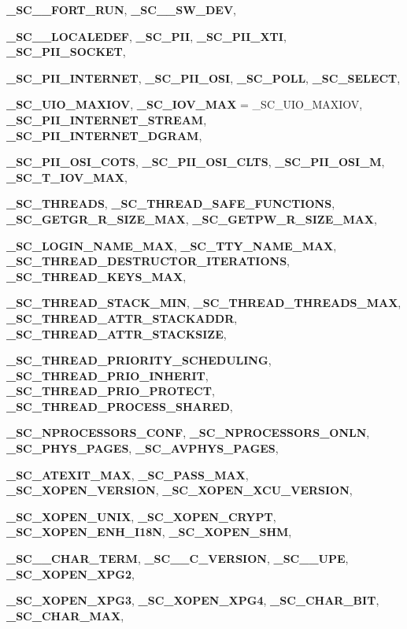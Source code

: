 \begin{DoxyCompactItemize}
{\bf \_\-SC\_\_\-FORT\_\-RUN}, 
{\bf \_\-SC\_\_\-SW\_\-DEV}, 
\par
{\bf \_\-SC\_\_\-LOCALEDEF}, 
{\bf \_\-SC\_\-PII}, 
{\bf \_\-SC\_\-PII\_\-XTI}, 
{\bf \_\-SC\_\-PII\_\-SOCKET}, 
\par
{\bf \_\-SC\_\-PII\_\-INTERNET}, 
{\bf \_\-SC\_\-PII\_\-OSI}, 
{\bf \_\-SC\_\-POLL}, 
{\bf \_\-SC\_\-SELECT}, 
\par
{\bf \_\-SC\_\-UIO\_\-MAXIOV}, 
{\bf \_\-SC\_\-IOV\_\-MAX} =  \_\-SC\_\-UIO\_\-MAXIOV, 
{\bf \_\-SC\_\-PII\_\-INTERNET\_\-STREAM}, 
{\bf \_\-SC\_\-PII\_\-INTERNET\_\-DGRAM}, 
\par
{\bf \_\-SC\_\-PII\_\-OSI\_\-COTS}, 
{\bf \_\-SC\_\-PII\_\-OSI\_\-CLTS}, 
{\bf \_\-SC\_\-PII\_\-OSI\_\-M}, 
{\bf \_\-SC\_\-T\_\-IOV\_\-MAX}, 
\par
{\bf \_\-SC\_\-THREADS}, 
{\bf \_\-SC\_\-THREAD\_\-SAFE\_\-FUNCTIONS}, 
{\bf \_\-SC\_\-GETGR\_\-R\_\-SIZE\_\-MAX}, 
{\bf \_\-SC\_\-GETPW\_\-R\_\-SIZE\_\-MAX}, 
\par
{\bf \_\-SC\_\-LOGIN\_\-NAME\_\-MAX}, 
{\bf \_\-SC\_\-TTY\_\-NAME\_\-MAX}, 
{\bf \_\-SC\_\-THREAD\_\-DESTRUCTOR\_\-ITERATIONS}, 
{\bf \_\-SC\_\-THREAD\_\-KEYS\_\-MAX}, 
\par
{\bf \_\-SC\_\-THREAD\_\-STACK\_\-MIN}, 
{\bf \_\-SC\_\-THREAD\_\-THREADS\_\-MAX}, 
{\bf \_\-SC\_\-THREAD\_\-ATTR\_\-STACKADDR}, 
{\bf \_\-SC\_\-THREAD\_\-ATTR\_\-STACKSIZE}, 
\par
{\bf \_\-SC\_\-THREAD\_\-PRIORITY\_\-SCHEDULING}, 
{\bf \_\-SC\_\-THREAD\_\-PRIO\_\-INHERIT}, 
{\bf \_\-SC\_\-THREAD\_\-PRIO\_\-PROTECT}, 
{\bf \_\-SC\_\-THREAD\_\-PROCESS\_\-SHARED}, 
\par
{\bf \_\-SC\_\-NPROCESSORS\_\-CONF}, 
{\bf \_\-SC\_\-NPROCESSORS\_\-ONLN}, 
{\bf \_\-SC\_\-PHYS\_\-PAGES}, 
{\bf \_\-SC\_\-AVPHYS\_\-PAGES}, 
\par
{\bf \_\-SC\_\-ATEXIT\_\-MAX}, 
{\bf \_\-SC\_\-PASS\_\-MAX}, 
{\bf \_\-SC\_\-XOPEN\_\-VERSION}, 
{\bf \_\-SC\_\-XOPEN\_\-XCU\_\-VERSION}, 
\par
{\bf \_\-SC\_\-XOPEN\_\-UNIX}, 
{\bf \_\-SC\_\-XOPEN\_\-CRYPT}, 
{\bf \_\-SC\_\-XOPEN\_\-ENH\_\-I18N}, 
{\bf \_\-SC\_\-XOPEN\_\-SHM}, 
\par
{\bf \_\-SC\_\_\-CHAR\_\-TERM}, 
{\bf \_\-SC\_\_\-C\_\-VERSION}, 
{\bf \_\-SC\_\_\-UPE}, 
{\bf \_\-SC\_\-XOPEN\_\-XPG2}, 
\par
{\bf \_\-SC\_\-XOPEN\_\-XPG3}, 
{\bf \_\-SC\_\-XOPEN\_\-XPG4}, 
{\bf \_\-SC\_\-CHAR\_\-BIT}, 
{\bf \_\-SC\_\-CHAR\_\-MAX}, 
\par

\end{DoxyCompactItemize}
